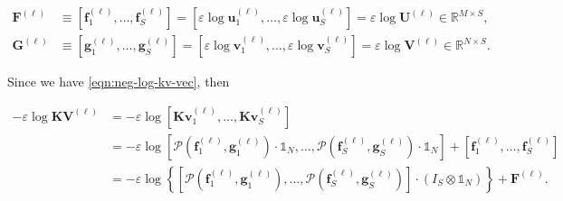 \begin{equation*}
  \begin{aligned}
    \mathbf{F}^{(\ell)}
     & \equiv \left[
    \mathbf{f}_1^{(\ell)}, \ldots, \mathbf{f}_S^{(\ell)}
    \right]
    =
    \left[
    \varepsilon \log \mathbf{u}_1^{(\ell)}, \ldots, \varepsilon \log \mathbf{u}_S^{(\ell)}
    \right]
    = \varepsilon \log \mathbf{U}^{(\ell)} \in \mathbb{R}^{M \times S}, \\
    \mathbf{G}^{(\ell)}
     & \equiv \left[
      \mathbf{g}^{(\ell)}_1, \ldots, \mathbf{g}^{(\ell)}_S
      \right]
    = \left[
      \varepsilon \log \mathbf{v}^{(\ell)}_1, \ldots, \varepsilon \log \mathbf{v}^{(\ell)}_S
      \right]
    = \varepsilon \log \mathbf{V}^{(\ell)} \in \mathbb{R}^{N \times S}.
  \end{aligned}
\end{equation*}




Since we have \cref{eqn:neg-log-kv-vec}, then

\begin{equation*}
  \begin{aligned}
    - \varepsilon \log \mathbf{K} \mathbf{V}^{(\ell)}
     & =
    - \varepsilon \log \left[
      \mathbf{K} \mathbf{v}^{(\ell)}_1, \ldots, \mathbf{K} \mathbf{v}^{(\ell)}_S
    \right] \\
     & =
    - \varepsilon \log \left[
      \mathcal{P} \left(\mathbf{f}^{(\ell)}_1, \mathbf{g}^{(\ell)}_1\right) \cdot \mathbb{1}_N,
      \ldots,
      \mathcal{P} \left(\mathbf{f}^{(\ell)}_S, \mathbf{g}^{(\ell)}_S\right) \cdot \mathbb{1}_N
      \right] + \left[
      \mathbf{f}^{(\ell)}_1, \ldots, \mathbf{f}^{(\ell)}_S
    \right] \\
     & =
    - \varepsilon \log
    \left\{
    \left[
      \mathcal{P} \left(\mathbf{f}^{(\ell)}_1, \mathbf{g}^{(\ell)}_1\right),
      \ldots,
      \mathcal{P} \left(\mathbf{f}^{(\ell)}_S, \mathbf{g}^{(\ell)}_S\right)
      \right] \cdot
    \left(I_S \otimes \mathbb{1}_N\right)
    \right\}
    + \mathbf{F}^{(\ell)}.
  \end{aligned}
\end{equation*}

